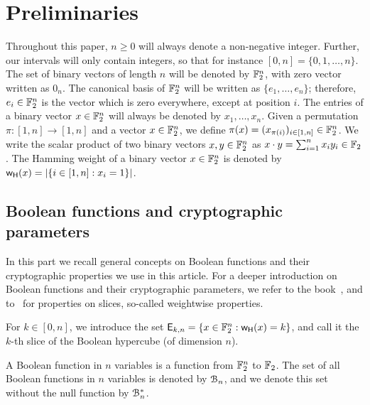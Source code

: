\documentclass[11pt]{llncs}
\begin{document}
\section{Preliminaries}

Throughout this paper, $n\geq 0$ will always denote a non-negative integer. Further, our intervals will only contain integers, so that for instance $[0,n]=\{0,1,\dots,n\}$. The set of binary vectors of length $n$ will be denoted by $\mathbb{F}_2^n$, with zero vector written as $0_n$. The canonical basis of $\mathbb{F}_2^n$ will be written as $\{e_1,\dots,e_n\}$; therefore, $e_i\in\mathbb{F}_2^n$ is the vector which is zero everywhere, except at position $i$. The entries of a binary vector $x\in\mathbb{F}_2^n$ will always be denoted by $x_1,\dots,x_n$. Given a permutation $\pi:[1,n]\to[1,n]$ and a vector $x\in\mathbb{F}_2^n$, we define $\pi(x)=(x_{\pi(i)})_{i\in[1,n]}\in\mathbb{F}_2^n$. We write the scalar product of two binary vectors $x,y\in\mathbb{F}_2^n$ as $x\cdot y=\sum_{i=1}^nx_iy_i\in\mathbb{F}_2$. The Hamming weight of a binary vector $x\in\mathbb{F}_2^n$ is denoted by $\mathsf{w_H}(x)=|\{i\in [1,n]:x_i=1\}|$.

\subsection{Boolean functions and cryptographic parameters}

In this part we recall general concepts on Boolean functions and their cryptographic properties we use in this article. 
For a deeper introduction on Boolean functions and their cryptographic parameters, we refer to the book~\cite{Carlet20}, and to~\cite{TOSC:CarMeaRot17} for properties on slices, so-called weightwise properties.


\begin{definition}[Slice]
    For $k \in [0,n]$, we introduce the set $\mathsf{E}_{k,n}=\{x\in \mathbb{F}_2^n:\mathsf{w_H}(x)=k\}$, and call it the $k$-th slice of the Boolean hypercube (of dimension $n$). 
\end{definition}

\begin{definition}\label{def:bool_f}
	A Boolean function in $n$ variables is a function from $\mathbb{F}_2^n$ to $\mathbb{F}_2$. The set of all Boolean functions in $n$ variables is denoted by $\mathcal{B}_n$, and we denote this set without the null function by $\mathcal{B}_n^*$.
\end{definition}
\end{document}
